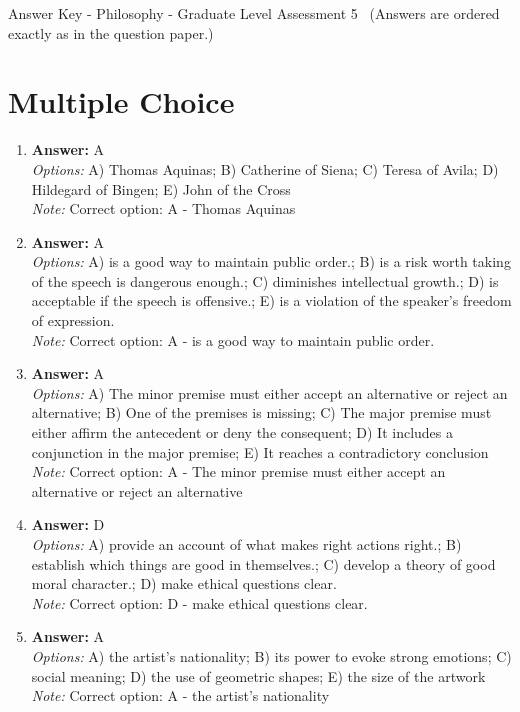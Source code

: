 \documentclass[12pt]{article}
\begin{document}
\begin{center}
Answer Key - Philosophy - Graduate Level Assessment 5 \
\small (Answers are ordered exactly as in the question paper.)
\end{center}

\section*{Multiple Choice}
\begin{enumerate}[label=\arabic*.]
\item \textbf{Answer:} A
\\ \textit{Options:} A) Thomas Aquinas; B) Catherine of Siena; C) Teresa of Avila; D) Hildegard of Bingen; E) John of the Cross
\\ \textit{Note:} Correct option: A - Thomas Aquinas
\item \textbf{Answer:} A
\\ \textit{Options:} A) is a good way to maintain public order.; B) is a risk worth taking of the speech is dangerous enough.; C) diminishes intellectual growth.; D) is acceptable if the speech is offensive.; E) is a violation of the speaker's freedom of expression.
\\ \textit{Note:} Correct option: A - is a good way to maintain public order.
\item \textbf{Answer:} A
\\ \textit{Options:} A) The minor premise must either accept an alternative or reject an alternative; B) One of the premises is missing; C) The major premise must either affirm the antecedent or deny the consequent; D) It includes a conjunction in the major premise; E) It reaches a contradictory conclusion
\\ \textit{Note:} Correct option: A - The minor premise must either accept an alternative or reject an alternative
\item \textbf{Answer:} D
\\ \textit{Options:} A) provide an account of what makes right actions right.; B) establish which things are good in themselves.; C) develop a theory of good moral character.; D) make ethical questions clear.
\\ \textit{Note:} Correct option: D - make ethical questions clear.
\item \textbf{Answer:} A
\\ \textit{Options:} A) the artist's nationality; B) its power to evoke strong emotions; C) social meaning; D) the use of geometric shapes; E) the size of the artwork
\\ \textit{Note:} Correct option: A - the artist's nationality
\end{enumerate}
\end{document}
